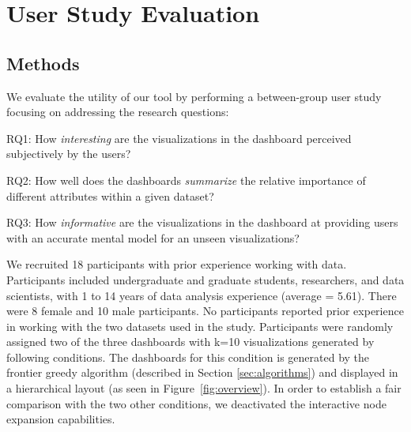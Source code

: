 \section{User Study Evaluation\label{sec:userstudy}}
\subsection{Methods}
We evaluate the utility of our tool by performing a between-group user study focusing on addressing the research questions:
\begin{denselist}
	\item RQ1: How \textit{interesting} are the visualizations in the dashboard perceived subjectively by the users?
	\item RQ2: How well does the dashboards \textit{summarize} the relative importance of different attributes within a given dataset?
	\item RQ3: How \textit{informative} are the visualizations in the dashboard at providing users with an accurate mental model for an unseen visualizations? %
\end{denselist}
We recruited 18 participants with prior experience working with data. Participants included undergraduate and graduate students, researchers, and data scientists, with 1 to 14 years of data analysis experience (average = 5.61).  %
There were 8 female and 10 male participants. No participants reported prior experience in working with the two datasets used in the study. Participants were randomly assigned two of the three dashboards with k=10 visualizations generated by following conditions. 
\stitle{\system:} The dashboards for this condition is generated by the frontier greedy algorithm (described in Section \ref{sec:algorithms}) and displayed in a hierarchical layout (as seen in Figure~\ref{fig:overview}). In order to establish a fair comparison with the two other conditions, we deactivated the interactive node expansion capabilities.
